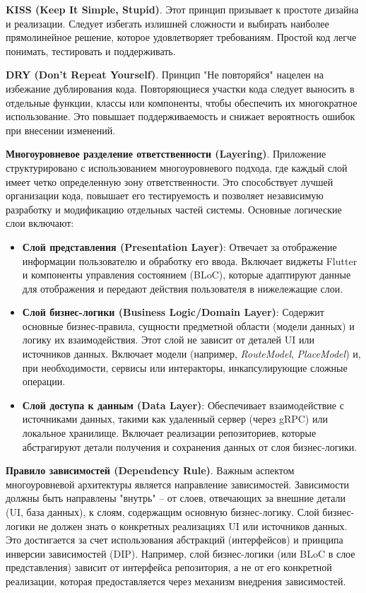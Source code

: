 \textbf{KISS (Keep It Simple, Stupid)}.
Этот принцип призывает к простоте дизайна и реализации. Следует избегать излишней сложности и выбирать наиболее прямолинейное решение, которое удовлетворяет требованиям. Простой код легче понимать, тестировать и поддерживать.

\textbf{DRY (Don't Repeat Yourself)}.
Принцип "Не повторяйся" нацелен на избежание дублирования кода. Повторяющиеся участки кода следует выносить в отдельные функции, классы или компоненты, чтобы обеспечить их многократное использование. Это повышает поддерживаемость и снижает вероятность ошибок при внесении изменений.

\textbf{Многоуровневое разделение ответственности (Layering)}.
Приложение структурировано с использованием многоуровневого подхода, где каждый слой имеет четко определенную зону ответственности. Это способствует лучшей организации кода, повышает его тестируемость и позволяет независимую разработку и модификацию отдельных частей системы. Основные логические слои включают:
\begin{itemize}
    \item \textbf{Слой представления (Presentation Layer)}: Отвечает за отображение информации пользователю и обработку его ввода. Включает виджеты Flutter и компоненты управления состоянием (BLoC), которые адаптируют данные для отображения и передают действия пользователя в нижележащие слои.
    \item \textbf{Слой бизнес-логики (Business Logic/Domain Layer)}: Содержит основные бизнес-правила, сущности предметной области (модели данных) и логику их взаимодействия. Этот слой не зависит от деталей UI или источников данных. Включает модели (например, \textit{RouteModel}, \textit{PlaceModel}) и, при необходимости, сервисы или интеракторы, инкапсулирующие сложные операции.
    \item \textbf{Слой доступа к данным (Data Layer)}: Обеспечивает взаимодействие с источниками данных, такими как удаленный сервер (через gRPC) или локальное хранилище. Включает реализации репозиториев, которые абстрагируют детали получения и сохранения данных от слоя бизнес-логики.
\end{itemize}

\textbf{Правило зависимостей (Dependency Rule)}.
Важным аспектом многоуровневой архитектуры является направление зависимостей. Зависимости должны быть направлены "внутрь" – от слоев, отвечающих за внешние детали (UI, база данных), к слоям, содержащим основную бизнес-логику. Слой бизнес-логики не должен знать о конкретных реализациях UI или источников данных. Это достигается за счет использования абстракций (интерфейсов) и принципа инверсии зависимостей (DIP). Например, слой бизнес-логики (или BLoC в слое представления) зависит от интерфейса репозитория, а не от его конкретной реализации, которая предоставляется через механизм внедрения зависимостей.

